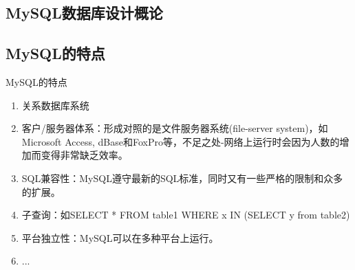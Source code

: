 \documentclass[CJK]{beamer}
\begin{document}
\begin{CJK*}{UTF8}{gbsn}
\section{MySQL数据库设计概论}

\subsection{MySQL的特点}
\begin{frame}{MySQL的特点}
	\begin{enumerate}
		\item 关系数据库系统
		\item 客户/服务器体系：形成对照的是文件服务器系统(file-server system)，如Microsoft Access, dBase和FoxPro等，不足之处-网络上运行时会因为人数的增加而变得非常缺乏效率。
		\item SQL兼容性：MySQL遵守最新的SQL标准，同时又有一些严格的限制和众多的扩展。
		\item 子查询：如SELECT * FROM table1 WHERE x IN (SELECT y from table2)
		\item 平台独立性：MySQL可以在多种平台上运行。
		\item ...
	\end{enumerate}
\end{frame}


\end{CJK*}
\end{document}
